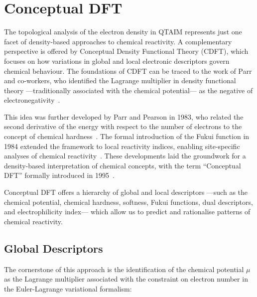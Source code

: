 \newpage
\section{Conceptual DFT}

The topological analysis of the electron density in QTAIM represents just one 
facet of density-based approaches to chemical reactivity. A complementary 
perspective is offered by Conceptual Density Functional Theory (\gls{CDFT}), 
which focuses on how variations in global and local electronic descriptors 
govern chemical behaviour. The foundations of \gls{CDFT} can be traced to the 
work of Parr and co-workers, who identified the Lagrange multiplier 
in density functional theory ---traditionally associated with the chemical 
potential--- as the negative of electronegativity~\cite{Parr1978}.

\vspace{1em}%
This idea was further developed by Parr and Pearson in 1983, who related the
second derivative of the energy with respect to the number of electrons to the
concept of chemical hardness~\cite{Parr1983}. The formal introduction of the
Fukui function in 1984 extended the framework to local reactivity indices,
enabling site-specific analyses of chemical reactivity~\cite{Parr1984}. These
developments laid the groundwork for a density-based interpretation of chemical
concepts, with the term ``Conceptual DFT'' formally introduced in
1995~\cite{Parr1995}.

\vspace{1em}%
Conceptual DFT offers a hierarchy of global and local descriptors ---such as
the chemical potential, chemical hardness, softness, Fukui functions, dual
descriptors, and electrophilicity index--- which allow us to predict and
rationalise patterns of chemical reactivity.

\newpage
\subsection{Global Descriptors}

The cornerstone of this approach is the identification of the chemical
potential $\mu$ as the Lagrange multiplier associated with the constraint on
electron number in the Euler-Lagrange variational formalism:

